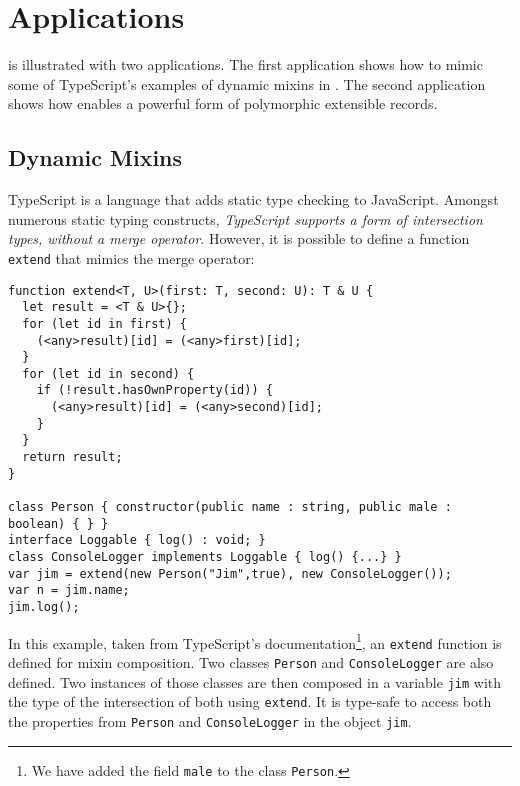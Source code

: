 \section{Applications}
\label{subsec:records}

\name is illustrated with two applications. The
first application shows how to mimic some of TypeScript's examples of 
dynamic mixins in \name. The second application shows how \name
enables a powerful form of polymorphic extensible records.

\subsection{Dynamic Mixins}\label{subsec:mixins}
TypeScript is a language that adds static type checking to JavaScript.
Amongst numerous static typing constructs, \emph{TypeScript supports a form of intersection types, 
without a merge operator}. 
However, it is possible to define a function \lstinline{extend}
that mimics the merge operator:

\begin{lstlisting}
function extend<T, U>(first: T, second: U): T & U {
  let result = <T & U>{};
  for (let id in first) {
    (<any>result)[id] = (<any>first)[id];
  }
  for (let id in second) {
    if (!result.hasOwnProperty(id)) {
      (<any>result)[id] = (<any>second)[id];
    }
  }
  return result;
}

class Person { constructor(public name : string, public male : boolean) { } }
interface Loggable { log() : void; }
class ConsoleLogger implements Loggable { log() {...} }
var jim = extend(new Person("Jim",true), new ConsoleLogger());
var n = jim.name;
jim.log();
\end{lstlisting}

In this example, taken from TypeScript's documentation\footnote{We have added the field \lstinline$male$ to the class
\lstinline$Person$.}, 
an \lstinline$extend$ function is defined 
for mixin composition. Two classes \lstinline$Person$ and
\lstinline$ConsoleLogger$ are also defined.
Two instances of those classes are then composed in a variable \lstinline$jim$ with the type of 
the intersection of both using \lstinline{extend}. It is type-safe to access both the properties
from \lstinline$Person$ and \lstinline$ConsoleLogger$ in the object \lstinline$jim$.


